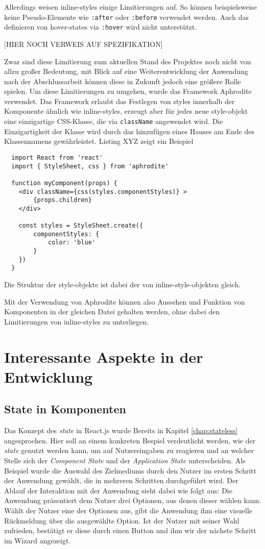 Allerdings weisen inline-styles einige Limitierungen auf. So können beispielsweise keine Pseudo-Elemente wie \verb|:after| oder \verb|:before| verwendet werden. Auch das definieren von hover-states via \verb|:hover| wird nicht unterstützt.

[HIER NOCH VERWEIS AUF SPEZIFIKATION]

Zwar sind diese Limitierung zum aktuellen Stand des Projektes noch nicht von allzu großer Bedeutung, mit Blick auf eine Weiterentwicklung der Anwendung nach der Abschlussarbeit können diese in Zukunft jedoch eine größere Rolle spielen.
Um diese  Limitierungen zu umgehen, wurde das Framework Aphrodite verwendet. Das Framework erlaubt das Festlegen von styles innerhalb der Komponente ähnlich wie inline-styles, erzeugt aber für jedes neue style-objekt eine einzigartige CSS-Klasse, die via \verb|className| angewendet wird. Die Einzigartigkeit der Klasse wird durch das hinzufügen eines Hauses am Ende des Klassennamens gewährleistet.  Listing XYZ zeigt ein Beispiel

\begin{lstlisting}
  import React from 'react'
  import { StyleSheet, css } from 'aphrodite'

  function myComponent(props) {
  	<div className={css(styles.componentStyles)} >
  		{props.children}
  	</div>

  	const styles = StyleSheet.create({
  		componentStyles: {
  			color: 'blue'
  		}
  	})
  }
\end{lstlisting}

Die Struktur der style-objekte ist dabei der von inline-style-objekten gleich.

Mit der Verwendung von Aphrodite können also Aussehen und Funktion von Komponenten in der gleichen Datei gehalten werden, ohne dabei den Limitierungen von inline-styles zu unterliegen.


\section{Interessante Aspekte in der Entwicklung}

\subsection{State in Komponenten}
Das Konzept des \textit{state} in React.js wurde Bereits in Kapitel \ref{chap:stateless} angesprochen. Hier soll an einem konkreten Bespiel verdeutlicht werden, wie der \textit{state} genutzt werden kann, um auf Nutzereingaben zu reagieren und an welcher Stelle sich der \textit{Component State} und der \textit{Application State} unterscheiden.
Als Beispiel wurde die Auswahl des Zielmediums durch den Nutzer im ersten Schritt der Anwendung gewählt, die in mehreren Schritten durchgeführt wird.
Der Ablauf der Interaktion mit der Anwendung sieht dabei wie folgt aus:
Die Anwendung präsentiert dem Nutzer drei Optionen, aus denen dieser wählen kann. Wählt der Nutzer eine der Optionen aus, gibt die Anwendung ihm eine visuelle Rückmeldung über die ausgewählte Option. Ist der Nutzer mit seiner Wahl zufrieden, bestätigt er diese durch einen Button und  ihm wir der nächste Schritt im Wizard angezeigt.

